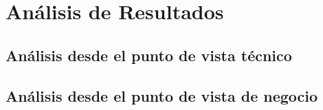 \chapter{Análisis de Resultados}
\label{chapter:solution}

\section{Análisis desde el punto de vista técnico}
\label{section:analisis-tecnico}

\section{Análisis desde el punto de vista de negocio}
\label{section:analisis-negocio}

